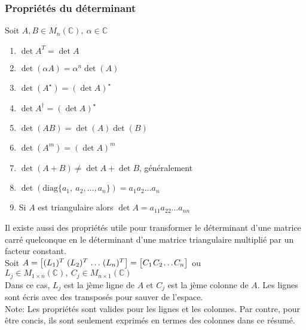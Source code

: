 \subsubsection{Propriétés du déterminant}
\noindent
Soit $A, B \in M_n(\mathbb{C}), \ \alpha \in \mathbb{C}$ \begin{enumerate}
    \item $\det A^T = \det A$
    \item $\det(\alpha A) = \alpha^n \det(A)$
    \item $\det (A^\star) = (\det A)^\star$
    \item $\det A^\dagger = (\det A)^\star$
    \item $\det(AB) = \det(A) \det(B)$
    \item $\det(A^m) = (\det A)^m$
    \item $\det(A + B) \neq \det A + \det B$, généralement
    \item $\det(\text{diag}\{a_1, \ a_2, \ldots, a_n \}) = a_1 a_2 \dots a_n$
    \item Si $A$ est triangulaire alors $\det A = a_{11} a_{22} \dots a_{nn}$
\end{enumerate}
Il existe aussi des propriétés utile pour transformer le déterminant d'une matrice carré quelconque
en le déterminant d'une matrice triangulaire multiplié par un facteur constant. \\
Soit $A = \arraycolsep=0.3\arraycolsep \begin{bmatrix}
        (L_1)^T & (L_2)^T & \ldots & (L_n)^T
    \end{bmatrix} = \arraycolsep=0.3\arraycolsep \begin{bmatrix}
        C_1 & C_2 & \ldots & C_n
    \end{bmatrix}$ ou $L_j \in M_{1 \times n}(\mathbb{C}), \ C_j \in M_{n\times 1}(\mathbb{C})$ \\
Dans ce cas, $L_j$ est la jème ligne de $A$ et $C_j$ est la jème colonne de $A$.
Les lignes sont écris avec des transposés pour sauver de l'espace. \\
Note: Les propriétés sont valides pour les lignes et les colonnes.
Par contre, pour être concis, ils sont seulement exprimés en termes des colonnes dans ce résumé.
